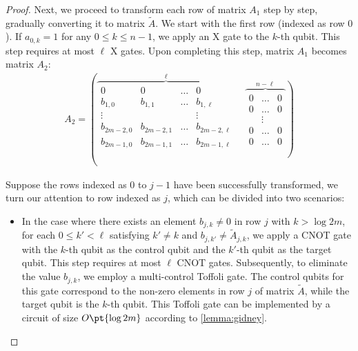 \documentclass[a4paper,UKenglish,cleveref, autoref, thm-restate]{lipics-v2021}
\newcommand{\bo}{O\pt}
\begin{document}
\begin{proof}
Next, we proceed to transform each row of matrix $A_1$ step by step, gradually converting it to matrix $\widetilde{A}$. We start with the first row (indexed as row $0$). If $a_{0, k} = 1$ for any $0 \leq k \leq n - 1$, we apply an X gate to the $k$-th qubit. This step requires at most $\ell$ X gates. Upon completing this step, matrix $A_1$ becomes matrix $A_2$:
\begin{align}
    A_2 = \left( \overbrace{\begin{matrix}
        0 & 0 & \dots & 0    \\
        b_{1, 0} & b_{1, 1} & \dots & b_{1, \ell}   \\
        \vdots & & & \vdots  \\
        b_{2m-2, 0} & b_{2m-2, 1} & \dots & b_{2m-2, \ell}   \\
        b_{2m-1, 0} & b_{2m-1, 1} & \dots & b_{2m-1, \ell}   \\
    \end{matrix}}^{\ell} \right. \quad
    \left. \overbrace{\begin{matrix}
           0 & \dots & 0 \\
           0 & \dots & 0 \\
           & \vdots& \\
           0 & \dots & 0 \\
           0 & \dots & 0 
    \end{matrix}}^{n - \ell} \right)
\end{align}

Suppose the rows indexed as $0$ to $j-1$ have been successfully transformed, we turn our attention to row indexed as $j$, which can be divided into two scenarios:

\begin{itemize}
    \item In the case where there exists an element $b_{j, k} \neq 0$ in row $j$ with $k > \log 2m$, for each $0 \leq k' < \ell$ satisfying $k' \neq k$ and $b_{j, k'} \neq \widetilde{A}_{j, k}$, we apply a CNOT gate with the $k$-th qubit as the control qubit and the $k'$-th qubit as the target qubit. This step requires at most $\ell$ CNOT gates. 
    Subsequently, to eliminate the value $b_{j, k}$, we employ a multi-control Toffoli gate. The control qubits for this gate correspond to the non-zero elements in row $j$ of matrix $\widetilde{A}$, while the target qubit is the $k$-th qubit. This Toffoli gate can be implemented by a circuit of size $\bo{\log 2m}$ according to \cref{lemma:gidney}.


\end{itemize}
\end{proof}
\end{document}
